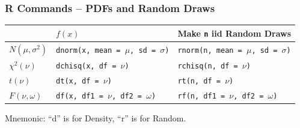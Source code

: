\documentclass[handout]{beamer}
\begin{document}
\begin{frame}
\frametitle{R Commands -- PDFs and Random Draws}
\footnotesize
\begin{table}
\begin{tabular}{l|ll}
&$f(x)$&Make \texttt{n} iid Random Draws\\
\hline
$N(\mu,\sigma^2)$ &\texttt{dnorm(x, mean = $\mu$,  sd = $\sigma$)}&\texttt{rnorm(n, mean = $\mu$,  sd = $\sigma$)}\\
$\chi^2(\nu)$&\texttt{dchisq(x, df = $\nu$)}&\texttt{rchisq(n, df = $\nu$)}\\
$t(\nu)$&\texttt{dt(x, df = $\nu$)}&\texttt{rt(n, df = $\nu$)}\\
$F(\nu,\omega)$&\texttt{df(x, df1 = $\nu$, df2 = $\omega$)}&\texttt{rf(n, df1 = $\nu$, df2 = $\omega$)}
\end{tabular}
\end{table}
\vspace{1em}
\normalsize
\alert{Mnemonic: ``d'' is for Density, ``r'' is for Random.}

\end{frame}
\end{document}
